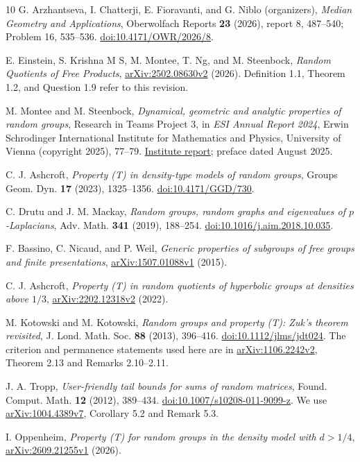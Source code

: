 \documentclass[11pt,letterpaper]{article}
\begin{document}
\begin{thebibliography}{10}\small
{}
G. Arzhantseva, I. Chatterji, E. Fioravanti, and G. Niblo (organizers),
\emph{Median Geometry and Applications}, Oberwolfach Reports \textbf{23} (2026), report 8, 487--540; Problem 16, 535--536.
\href{https://doi.org/10.4171/OWR/2026/8}{doi:10.4171/OWR/2026/8}.

E. Einstein, S. Krishna M S, M. Montee, T. Ng, and M. Steenbock,
\emph{Random Quotients of Free Products},
\href{https://arxiv.org/abs/2502.08630v2}{arXiv:2502.08630v2} (2026).
Definition 1.1, Theorem 1.2, and Question 1.9 refer to this revision.

M. Montee and M. Steenbock,
\emph{Dynamical, geometric and analytic properties of random groups},
Research in Teams Project 3, in \emph{ESI Annual Report 2024},
Erwin Schrodinger International Institute for Mathematics and Physics,
University of Vienna (copyright 2025), 77--79.
\href{https://www.esi.ac.at/static/assets/extras/reports/ESI_Report_2024.43f879fc9471.pdf}{Institute report}; preface dated August 2025.

C. J. Ashcroft, \emph{Property (T) in density-type models of random groups},
Groups Geom. Dyn. \textbf{17} (2023), 1325--1356.
\href{https://doi.org/10.4171/GGD/730}{doi:10.4171/GGD/730}.

C. Drutu and J. M. Mackay,
\emph{Random groups, random graphs and eigenvalues of $p$-Laplacians},
Adv. Math. \textbf{341} (2019), 188--254.
\href{https://doi.org/10.1016/j.aim.2018.10.035}{doi:10.1016/j.aim.2018.10.035}.

F. Bassino, C. Nicaud, and P. Weil,
\emph{Generic properties of subgroups of free groups and finite presentations},
\href{https://arxiv.org/abs/1507.01088v1}{arXiv:1507.01088v1} (2015).

C. J. Ashcroft,
\emph{Property (T) in random quotients of hyperbolic groups at densities above $1/3$},
\href{https://arxiv.org/abs/2202.12318v2}{arXiv:2202.12318v2} (2022).

M. Kotowski and M. Kotowski,
\emph{Random groups and property (T): Zuk's theorem revisited},
J. Lond. Math. Soc. \textbf{88} (2013), 396--416.
\href{https://doi.org/10.1112/jlms/jdt024}{doi:10.1112/jlms/jdt024}.
The criterion and permanence statements used here are in
\href{https://arxiv.org/abs/1106.2242v2}{arXiv:1106.2242v2}, Theorem 2.13 and Remarks 2.10--2.11.

J. A. Tropp, \emph{User-friendly tail bounds for sums of random matrices},
Found. Comput. Math. \textbf{12} (2012), 389--434.
\href{https://doi.org/10.1007/s10208-011-9099-z}{doi:10.1007/s10208-011-9099-z}.
We use \href{https://arxiv.org/abs/1004.4389v7}{arXiv:1004.4389v7}, Corollary 5.2 and Remark 5.3.

I. Oppenheim, \emph{Property (T) for random groups in the density model with $d>1/4$},
\href{https://arxiv.org/abs/2609.21255v1}{arXiv:2609.21255v1} (2026).
\end{thebibliography}
\end{document}
